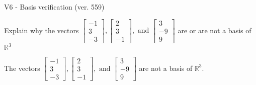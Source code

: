 \begin{exercise}
  \begin{exerciseTitle}V6 - Basis verification (ver. 559)\end{exerciseTitle}
  \begin{exerciseStatement}
    Explain why the vectors \(\left[\begin{array}{r}
-1 \\
3 \\
-3
\end{array}\right] , \left[\begin{array}{r}
2 \\
3 \\
-1
\end{array}\right] , \text{ and } \left[\begin{array}{r}
3 \\
-9 \\
9
\end{array}\right]\) are or are not a basis of \(\mathbb{R}^3\)	


  \end{exerciseStatement}
  \begin{exerciseAnswer}
   The vectors \(\left[\begin{array}{r}
-1 \\
3 \\
-3
\end{array}\right] , \left[\begin{array}{r}
2 \\
3 \\
-1
\end{array}\right] , \text{ and } \left[\begin{array}{r}
3 \\
-9 \\
9
\end{array}\right]\) 
  	 are not  a basis of \(\mathbb{R}^3\).
  


  \end{exerciseAnswer}
\end{exercise}